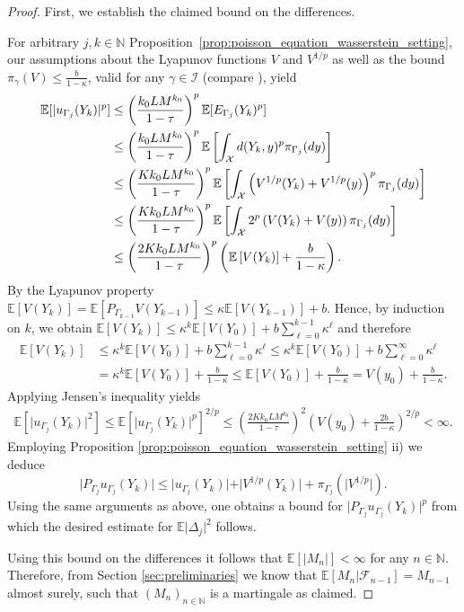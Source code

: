 \documentclass[12pt]{article}
\theoremstyle{definition}
\renewcommand{\d}{{\rm d}}
\newcommand{\N}{\mathbb{N}}
\newcommand{\E}{\mathbb{E}}
\newcommand{\cX}{\mathcal{X}}
\begin{document}
\begin{proof}
	First, we establish the claimed bound on the differences. 
	
	For arbitrary $j,k \in \N$ Proposition~\ref{prop:poisson_equation_wasserstein_setting}, our assumptions about the Lyapunov functions $V$ and $V^{1/p}$ as well as the bound $\pi_\gamma (V) \leq \frac{b}{1-\kappa}$, valid for any $\gamma \in \mathcal{I}$ (compare \cite[Proposition 4.24]{hairer2006ergodic}), yield
	\begin{align*}
		\E [\vert u_{\Gamma_{j}} (Y_k)\vert^p ] 
		&\leq 
		\left( \frac{k_0L M^{k_0} }{1- \tau}\right)^p  \E [ E_{\Gamma_{j}} (Y_k)^p] \\
		&\leq 
		\left( \frac{k_0L M^{k_0} }{1- \tau}\right)^p  \E \left[ \int_\cX d(Y_k, y)^p \pi_{\Gamma_j} (\d y)   \right] \\
		&\leq 
		\left( \frac{Kk_0L M^{k_0} }{1- \tau}\right)^p  \E \left[ \int_\cX \left(V^{1/p}(Y_k) + V^{1/p}(y) \right)^{p} \pi_{\Gamma_j} (\d y)   \right] \\
		&\leq 
		\left( \frac{Kk_0L M^{k_0} }{1- \tau}\right)^p  \E \left[ \int_\cX2^p \left(  V(Y_k) + V(y)\right)  \pi_{\Gamma_j} (\d y)   \right] \\
		&\leq 
		\left( \frac{2Kk_0L M^{k_0} }{1- \tau}\right)^p  \left( \E \left[ V(Y_k)   \right] + \frac{b}{1-\kappa} \right) .
	\end{align*}
	By the Lyapunov property $\E[V(Y_k)] = \E [P_{\Gamma_{k-1}}V(Y_{k-1})] \leq \kappa \E[V(Y_{k-1})] +b$.
		Hence, by induction on $k$, we obtain $\E[V(Y_k)] \leq \kappa^k \E[V(Y_{0})] +b\sum_{\ell=0}^{k-1}\kappa^\ell$ and therefore
		\begin{align*}
			\E \left[ V(Y_k)   \right] &\leq \kappa^k \E[V(Y_{0})] +b\sum_{\ell=0}^{k-1}\kappa^\ell \leq \kappa^k \E[V(Y_{0})] +b\sum_{\ell=0}^{\infty}\kappa^\ell \\ 
			&= 
			\kappa^k \E[V(Y_0)] + \frac{b}{1-\kappa} \leq \E[ V(Y_0)] + \frac{b}{1-\kappa}
			= V(y_0) + \frac{b}{1-\kappa}.
	\end{align*}
	Applying Jensen's inequality yields 
	\begin{align*}
		\E [\vert u_{\Gamma_{j}} (Y_k)\vert^2 ] 
		\leq
		\E [\vert u_{\Gamma_{j}} (Y_k)\vert^p ]^{2/p} 
		\leq   
		\left( \frac{2Kk_0L M^{k_0} }{1- \tau}\right)^2  \left( V(y_0) + \frac{2b}{1-\kappa} \right)^{2/p} < \infty.
	\end{align*}
	Employing Proposition \ref{prop:poisson_equation_wasserstein_setting} ii) we deduce 
	\[
	\vert P_{\Gamma_{j}} u_{\Gamma_{j}}(Y_k) \vert 
	\le   
	\vert u_{\Gamma_{j}}(Y_k) \vert + \vert V^{1/p}(Y_k) \vert + \pi_{\Gamma_j}(\vert V^{1/p} \vert ).
	\]
	Using the same arguments as above, one obtains a bound for $\vert P_{\Gamma_{j}} u_{\Gamma_{j}}(Y_k) \vert^p$ from which the desired estimate for $\E\vert \Delta_j \vert^2$ follows. 
	
	Using this bound on the differences it follows that $\E [\vert M_n \vert] < \infty$ for any $n \in \N$. Therefore, from Section \ref{sec:preliminaries} we know that $\E [M_n \vert \mathcal{F}_{n-1}] = M_{n-1}$ almost surely, such that $(M_n)_{n \in \N}$ is a martingale as claimed. 
\end{proof}
\end{document}
